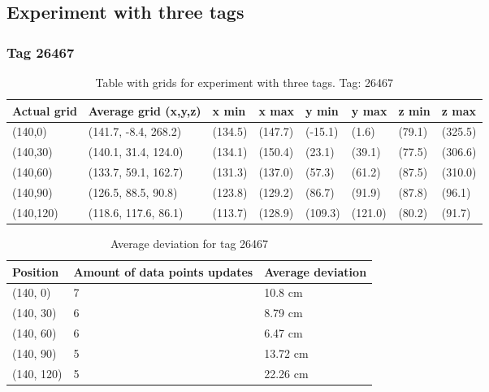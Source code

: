 \subsection{Experiment with three tags}
\subsubsection{Tag 26467}
\begin{table}[H] 
    \begin{tabular}{|l|l|l|l|l|l|l|l|}
    \hline
    Actual grid  & Average grid (x,y,z)      & x min       & x max      & y min      & y max       & z min      & z max    \\ \hline
    (140,0) 	& (141.7, -8.4, 268.2) 	 & (134.5) 	& (147.7)	& (-15.1)	 & (1.6) 	 & (79.1)	 & (325.5)	\\ \hline
    (140,30) 	& (140.1, 31.4, 124.0) 	 & (134.1) 	& (150.4)	& (23.1)	 & (39.1) 	 & (77.5)	 & (306.6)	\\ \hline
    (140,60) 	& (133.7, 59.1, 162.7) 	 & (131.3) 	& (137.0)	& (57.3)	 & (61.2) 	 & (87.5)	 & (310.0)	\\ \hline
    (140,90) 	& (126.5, 88.5, 90.8) 	 & (123.8) 	& (129.2)	& (86.7)	 & (91.9) 	 & (87.8)	 & (96.1)	\\ \hline
    (140,120) 	& (118.6, 117.6, 86.1) 	 & (113.7) 	& (128.9)	& (109.3)	 & (121.0) 	 & (80.2)	 & (91.7)	\\ \hline
    \end{tabular}
\label{Tab:three-tag-experiment-result-tag-26467}
\caption{Table with grids for experiment with three tags. Tag: 26467}
\end{table}

\begin{table}[H]
    \centering
    \begin{tabular}{|l|l|l|}
    \hline
    Position   & Amount of data points updates  & Average deviation \\ \hline
    (140, 0)   & 7                              & 10.8 cm             \\ \hline
    (140, 30)  & 6                              & 8.79 cm             \\ \hline
    (140, 60)  & 6                              & 6.47 cm              \\ \hline
    (140, 90)  & 5                              & 13.72 cm             \\ \hline
    (140, 120) & 5                              & 22.26 cm            \\ \hline
    \end{tabular}
    \caption{Average deviation for tag 26467}
\end{table}

